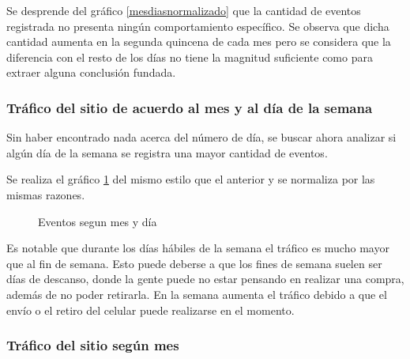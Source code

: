\documentclass[a4paper]{article}
\begin{document}
Se desprende del gráfico \ref{mesdiasnormalizado} que la cantidad de eventos registrada no presenta ningún comportamiento específico. Se observa que dicha cantidad aumenta en la segunda quincena de cada mes pero se considera que la diferencia con el resto de los días no tiene la magnitud suficiente como para extraer alguna conclusión fundada. 

\subsubsection{Tráfico del sitio de acuerdo al mes y al día de la semana}

Sin haber encontrado nada acerca del número de día, se buscar ahora analizar si algún día de la semana se registra una mayor cantidad de eventos. 

Se realiza el gráfico \ref{fig:messemanasnormalizado} del mismo estilo que el anterior y se normaliza por las mismas razones.

\begin{figure}[h!]
	\caption{Eventos segun mes y día}
	\label{fig:messemanasnormalizado}
\end{figure}

Es notable que durante los días hábiles de la semana el tráfico es mucho mayor que al fin de semana. Esto puede deberse a que los fines de semana suelen ser días de descanso, donde la gente puede no estar pensando en realizar una compra, además de no poder retirarla. En la semana aumenta el tráfico debido a que el envío o el retiro del celular puede realizarse en el momento.

\subsubsection{Tráfico del sitio según mes}
\end{document}
